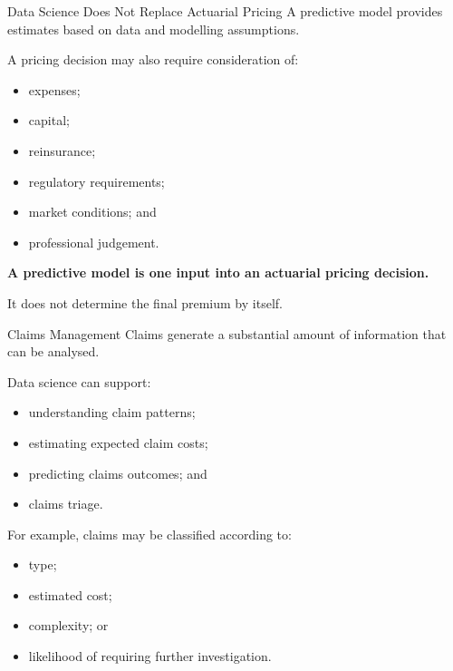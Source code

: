 \documentclass[
  ignorenonframetext,
  aspectratio=169,
]{beamer}
\providecommand{\tightlist}{%
  \setlength{\itemsep}{0pt}\setlength{\parskip}{0pt}}
\begin{document}
\begin{frame}{Data Science Does Not Replace Actuarial Pricing}
\protect{}\label{data-science-does-not-replace-actuarial-pricing}
A predictive model provides estimates based on data and modelling
assumptions.

A pricing decision may also require consideration of:

\begin{itemize}
\tightlist
\item
  expenses;
\item
  capital;
\item
  reinsurance;
\item
  regulatory requirements;
\item
  market conditions; and
\item
  professional judgement.
\end{itemize}

\begin{tcolorbox}[enhanced jigsaw, arc=.35mm, bottomrule=.15mm, bottomtitle=1mm, breakable, colback=white, colbacktitle=quarto-callout-note-color!10!white, colframe=quarto-callout-note-color-frame, coltitle=black, left=2mm, leftrule=.75mm, opacityback=0, opacitybacktitle=0.6, rightrule=.15mm, title=\textcolor{quarto-callout-note-color}{\faInfo}\hspace{0.5em}{Key idea}, titlerule=0mm, toprule=.15mm, toptitle=1mm]

\textbf{A predictive model is one input into an actuarial pricing
decision.}

It does not determine the final premium by itself.

\end{tcolorbox}
\end{frame}

\begin{frame}{Claims Management}
\protect{}\label{claims-management}
Claims generate a substantial amount of information that can be
analysed.

Data science can support:

\begin{itemize}
\tightlist
\item
  understanding claim patterns;
\item
  estimating expected claim costs;
\item
  predicting claims outcomes; and
\item
  claims triage.
\end{itemize}

For example, claims may be classified according to:

\begin{itemize}
\tightlist
\item
  type;
\item
  estimated cost;
\item
  complexity; or
\item
  likelihood of requiring further investigation.
\end{itemize}
\end{frame}
\end{document}
